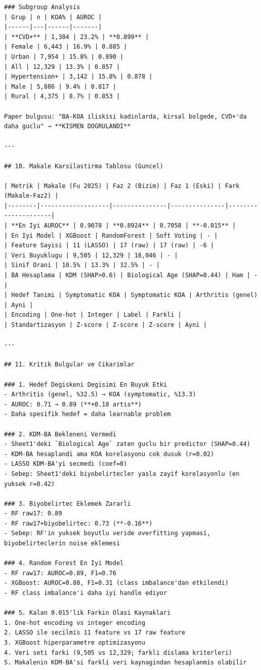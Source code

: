 ﻿\documentclass[11pt,a4paper]{article}
\begin{document}
\begin{verbatim}
### Subgroup Analysis
| Grup | n | KOA% | AUROC |
|------|---|------|-------|
| **CVD+** | 1,304 | 23.2% | **0.899** |
| Female | 6,443 | 16.9% | 0.885 |
| Urban | 7,954 | 15.8% | 0.890 |
| All | 12,329 | 13.3% | 0.857 |
| Hypertension+ | 3,142 | 15.8% | 0.878 |
| Male | 5,886 | 9.4% | 0.817 |
| Rural | 4,375 | 8.7% | 0.853 |

Paper bulgusu: "BA-KOA iliskisi kadinlarda, kirsal bolgede, CVD+'da daha guclu" → **KISMEN DOGRULANDI**

---

## 10. Makale Karsilastirma Tablosu (Guncel)

| Metrik | Makale (Fu 2025) | Faz 2 (Bizim) | Faz 1 (Eski) | Fark (Makale-Faz2) |
|--------|-------------------|---------------|---------------|---------------------|
| **En Iyi AUROC** | 0.9078 | **0.8924** | 0.7058 | **-0.015** |
| En Iyi Model | XGBoost | RandomForest | Soft Voting | - |
| Feature Sayisi | 11 (LASSO) | 17 (raw) | 17 (raw) | -6 |
| Veri Buyuklugu | 9,505 | 12,329 | 18,046 | - |
| Sinif Orani | 10.5% | 13.3% | 32.5% | - |
| BA Hesaplama | KDM (SHAP>0.6) | Biological Age (SHAP=0.44) | Ham | - |
| Hedef Tanimi | Symptomatic KOA | Symptomatic KOA | Arthritis (genel) | Ayni |
| Encoding | One-hot | Integer | Label | Farkli |
| Standartizasyon | Z-score | Z-score | Z-score | Ayni |

---

## 11. Kritik Bulgular ve Cikarimlar

### 1. Hedef Degiskeni Degisimi En Buyuk Etki
- Arthritis (genel, %32.5) → KOA (symptomatic, %13.3)
- AUROC: 0.71 → 0.89 (**+0.18 artis**)
- Daha spesifik hedef = daha learnable problem

### 2. KDM-BA Bekleneni Vermedi
- Sheet1'deki `Biological Age` zaten guclu bir predictor (SHAP=0.44)
- KDM-BA hesaplandi ama KOA korelasyonu cok dusuk (r=0.02)
- LASSO KDM-BA'yi secmedi (coef=0)
- Sebep: Sheet1'deki biyobelirtecler yasla zayif korelasyonlu (en yuksek r=0.42)

### 3. Biyobelirtec Eklemek Zararli
- RF raw17: 0.89
- RF raw17+biyobelirtec: 0.73 (**-0.16**)
- Sebep: RF'in yuksek boyutlu veride overfitting yapmasi, biyobelirteclerin noise eklemesi

### 4. Random Forest En Iyi Model
- RF raw17: AUROC=0.89, F1=0.76
- XGBoost: AUROC=0.80, F1=0.31 (class imbalance'dan etkilendi)
- RF class imbalance'i daha iyi handle ediyor

### 5. Kalan 0.015'lik Farkin Olasi Kaynaklari
1. One-hot encoding vs integer encoding
2. LASSO ile secilmis 11 feature vs 17 raw feature
3. XGBoost hiperparametre optimizasyonu
4. Veri seti farki (9,505 vs 12,329; farkli dislama kriterleri)
5. Makalenin KDM-BA'si farkli veri kaynagindan hesaplanmis olabilir


\end{verbatim}
\end{document}
